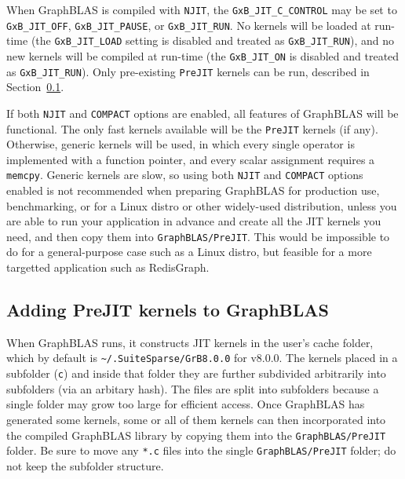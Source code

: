 \documentclass[12pt]{article}
\begin{document}
When GraphBLAS is compiled with \verb'NJIT', the \verb'GxB_JIT_C_CONTROL' may be
set to \verb'GxB_JIT_OFF', \verb'GxB_JIT_PAUSE', or \verb'GxB_JIT_RUN'.  No
kernels will be loaded at run-time (the \verb'GxB_JIT_LOAD' setting is disabled
and treated as \verb'GxB_JIT_RUN'), and no new kernels will be compiled at
run-time (the \verb'GxB_JIT_ON' is disabled and treated as \verb'GxB_JIT_RUN').
Only pre-existing \verb'PreJIT' kernels can be run, described in
Section~\ref{prejit}.

If both \verb'NJIT' and \verb'COMPACT' options are enabled, all features of
GraphBLAS will be functional.  The only fast kernels available will be the
\verb'PreJIT' kernels (if any).  Otherwise, generic kernels will be used, in
which every single operator is implemented with a function pointer, and every
scalar assignment requires a \verb'memcpy'.  Generic kernels are slow, so using
both \verb'NJIT' and \verb'COMPACT' options enabled is not recommended when
preparing GraphBLAS for production use, benchmarking, or for a Linux distro or
other widely-used distribution, unless you are able to run your application in
advance and create all the JIT kernels you need, and then copy them into
\verb'GraphBLAS/PreJIT'.  This would be impossible to do for a general-purpose
case such as a Linux distro, but feasible for a more targetted application such
as RedisGraph.

\subsection{Adding {\sf PreJIT} kernels to GraphBLAS}
\label{prejit}

When GraphBLAS runs, it constructs JIT kernels in the user's cache folder,
which by default is \verb'~/.SuiteSparse/GrB8.0.0' for v8.0.0.  The
kernels placed in a subfolder (\verb'c') and inside that folder they are
further subdivided arbitrarily into subfolders (via an arbitary hash).  The
files are split into subfolders because a single folder may grow too large for
efficient access.  Once GraphBLAS has generated some kernels, some or all of
them kernels can then incorporated into the compiled GraphBLAS library by
copying them into the \verb'GraphBLAS/PreJIT' folder.  Be sure to move any
\verb'*.c' files into the single \verb'GraphBLAS/PreJIT' folder; do not keep
the subfolder structure.
\end{document}
